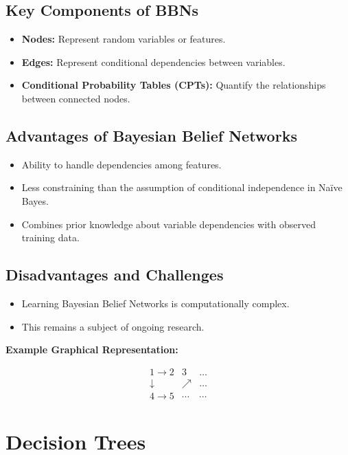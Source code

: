\documentclass{article}
\begin{document}
\subsection*{Key Components of BBNs}
\begin{itemize}
    \item \textbf{Nodes:} Represent random variables or features.
    \item \textbf{Edges:} Represent conditional dependencies between variables.
    \item \textbf{Conditional Probability Tables (CPTs):} Quantify the relationships between connected nodes.
\end{itemize}

\subsection*{Advantages of Bayesian Belief Networks}
\begin{itemize}
    \item Ability to handle dependencies among features.
    \item Less constraining than the assumption of conditional independence in Naïve Bayes.
    \item Combines prior knowledge about variable dependencies with observed training data.
\end{itemize}

\subsection*{Disadvantages and Challenges}
\begin{itemize}
    \item Learning Bayesian Belief Networks is computationally complex.
    \item This remains a subject of ongoing research.
\end{itemize}

\vspace{0.5cm}
\noindent \textbf{Example Graphical Representation:}

\[
\begin{array}{ccc}
1 \rightarrow 2 & 3 & \dots \\
\downarrow & \nearrow & \dots \\
4 \rightarrow 5 & \cdots & \cdots
\end{array}
\]

\section{Decision Trees}
\end{document}
